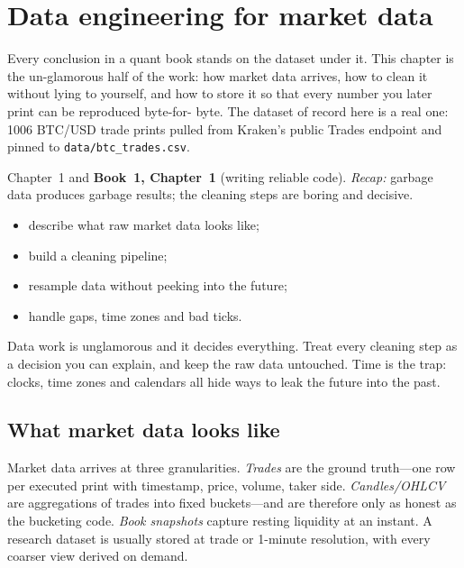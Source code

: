 \chapter{Data engineering for market data}\label{ch:data}

\noindent Every conclusion in a quant book stands on the dataset under it. This chapter is the
un-glamorous half of the work: how market data arrives, how to clean it without lying to
yourself, and how to store it so that every number you later print can be reproduced byte-for-
byte. The dataset of record here is a real one: 1006 BTC/USD trade prints pulled from
Kraken's public Trades endpoint and pinned to \texttt{data/btc\_trades.csv}.

\begin{rulebox}
Chapter~1 and \textbf{Book~1, Chapter~1} (writing reliable code). \emph{Recap:} garbage data produces garbage results; the cleaning steps are boring and decisive.
\end{rulebox}
\begin{wins}
\begin{itemize}
\item describe what raw market data looks like;
\item build a cleaning pipeline;
\item resample data without peeking into the future;
\item handle gaps, time zones and bad ticks.
\end{itemize}
\end{wins}
\begin{principle}
Data work is unglamorous and it decides everything. Treat every cleaning step as a decision you can explain, and keep the raw data untouched. Time is the trap: clocks, time zones and calendars all hide ways to leak the future into the past.
\end{principle}

\section{What market data looks like}\label{sec:marketdata}

Market data arrives at three granularities. \emph{Trades} are the ground truth---one row per
executed print with timestamp, price, volume, taker side. \emph{Candles/OHLCV} are
aggregations of trades into fixed buckets---and are therefore only as honest as the bucketing
code. \emph{Book snapshots} capture resting liquidity at an instant. A research dataset is
usually stored at trade or 1-minute resolution, with every coarser view derived on demand.

